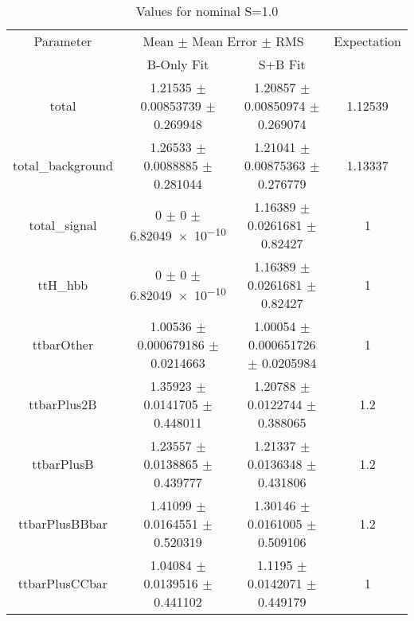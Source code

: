 \begin{table}
\centering
\caption{Values for nominal S=1.0}
\begin{tabular}{cccc}
\toprule
Parameter & \multicolumn{2}{c}{Mean $\pm$ Mean Error $\pm$ RMS} & Expectation\\
 & B-Only Fit & S+B Fit & \\
\midrule
total & \num{1.21535} $\pm$ \num{0.00853739} $\pm$ \num{0.269948} & \num{1.20857} $\pm$ \num{0.00850974} $\pm$ \num{0.269074} & \num{1.12539}\\
total\_background & \num{1.26533} $\pm$ \num{0.0088885} $\pm$ \num{0.281044} & \num{1.21041} $\pm$ \num{0.00875363} $\pm$ \num{0.276779} & \num{1.13337}\\
total\_signal & \num{0} $\pm$ \num{0} $\pm$ \num{6.82049e-10} & \num{1.16389} $\pm$ \num{0.0261681} $\pm$ \num{0.82427} & \num{1}\\
ttH\_hbb & \num{0} $\pm$ \num{0} $\pm$ \num{6.82049e-10} & \num{1.16389} $\pm$ \num{0.0261681} $\pm$ \num{0.82427} & \num{1}\\
ttbarOther & \num{1.00536} $\pm$ \num{0.000679186} $\pm$ \num{0.0214663} & \num{1.00054} $\pm$ \num{0.000651726} $\pm$ \num{0.0205984} & \num{1}\\
ttbarPlus2B & \num{1.35923} $\pm$ \num{0.0141705} $\pm$ \num{0.448011} & \num{1.20788} $\pm$ \num{0.0122744} $\pm$ \num{0.388065} & \num{1.2}\\
ttbarPlusB & \num{1.23557} $\pm$ \num{0.0138865} $\pm$ \num{0.439777} & \num{1.21337} $\pm$ \num{0.0136348} $\pm$ \num{0.431806} & \num{1.2}\\
ttbarPlusBBbar & \num{1.41099} $\pm$ \num{0.0164551} $\pm$ \num{0.520319} & \num{1.30146} $\pm$ \num{0.0161005} $\pm$ \num{0.509106} & \num{1.2}\\
ttbarPlusCCbar & \num{1.04084} $\pm$ \num{0.0139516} $\pm$ \num{0.441102} & \num{1.1195} $\pm$ \num{0.0142071} $\pm$ \num{0.449179} & \num{1}\\
\bottomrule
\end{tabular}
\end{table}